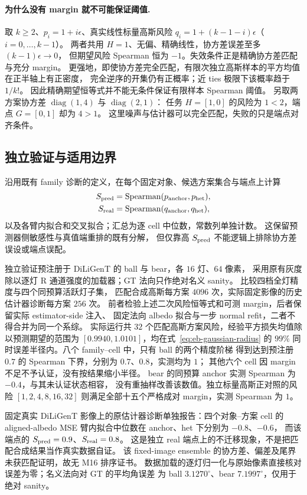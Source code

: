 \paragraph{为什么没有 margin 就不可能保证阈值.}
取 $k\ge2$、$p_i=1+i\epsilon$、真实线性标量高斯风险
$q_i=1+(k-1-i)\epsilon$（$i=0,\ldots,k-1$）。
两者共用 $H=1$、无偏、精确线性，协方差误差至多 $(k-1)\epsilon\to0$，
但期望风险 Spearman 恒为 $-1$。失效条件正是精确协方差匹配与充分 margin。
更强地，即使协方差完全匹配，有限次独立高斯样本的平方均值在正半轴上有正密度，
完全逆序的开集仍有正概率；近 ties 极限下该概率趋于 $1/k!$。
因此精确期望恒等式并不能无条件保证有限样本 Spearman 阈值。
另取两方案协方差 $\operatorname{diag}(1,4)$ 与 $\operatorname{diag}(2,1)$：
任务 $H=[1,0]$ 的风险为 $1<2$，端点 $G=[0,1]$ 却为 $4>1$。
这里噪声与估计器可以完全匹配，失败的只是端点对齐条件。

\subsection{独立验证与适用边界}
沿用既有 family 诊断的定义，在每个固定对象、候选方案集合与端点上计算
\begin{align*}
 S_{\rm pred}&=\operatorname{Spearman}(p_{\rm anchor},p_{\rm het}),\\
 S_{\rm real}&=\operatorname{Spearman}(q_{\rm anchor},q_{\rm het}),
\end{align*}
以及各臂内拟合和交叉拟合；汇总为逐 cell 中位数，常数列单独计数。
这保留预测器侧敏感性与真值端重排的既有分解，
但仅靠高 $S_{\rm pred}$ 不能逻辑上排除协方差误设或端点误配。

独立验证预注册于 DiLiGenT 的 ball 与 bear，各 $16$ 灯、$64$ 像素，
采用原有灰度除以逐灯 R 通道强度的加载器；GT 法向只作绝对名义 sanity。
比较四档全灯精度与四个同预算活跃灯子集，
匹配合成高斯每方案 $4096$ 次，实际固定影像的历史估计器诊断每方案 $256$ 次。
前者检验上述二次风险恒等式和可测 margin，后者保留实际 estimator-side 注入、
固定法向 albedo 拟合与一步 normal refit，二者不得合并为同一个系综。
实际运行共 $32$ 个匹配高斯方案风险，经验平方损失均值除以预测期望的范围为
$[0.9940,1.0101]$，均在式~\eqref{eq:eb-gaussian-radius} 的
$99\%$ 同时误差半径内。八个 family--cell 中，只有 ball 的两个精度阶梯
得到达到预注册 $0.7$ 的 Spearman 下界，分别为 $0.7$、$0.8$，实测均为 $1$；
其他六个 cell 因 margin 不足不予认证，没有按结果缩小半径。
bear 的同预算 anchor 实测 Spearman 为 $-0.4$，与其未认证状态相容，
没有重抽样改善该数值。独立标量高斯正对照的风险
$[1,2,4,8,16,32]$ 则满足全部十五个严格成对 margin，实测 Spearman 为 $1$。

固定真实 DiLiGenT 影像上的原估计器诊断单独报告：四个对象--方案 cell 的
aligned-albedo MSE 臂内拟合中位数在 anchor、het 下分别为 $-0.8$、$-0.6$，
而该端点的 $S_{\rm pred}=0.9$、$S_{\rm real}=0.8$。
这是独立 real 端点上的不迁移现象，不是把匹配合成结果当作真实数据自证。
该 fixed-image ensemble 的协方差、偏差及尾界未获匹配证明，故无 M16 排序证书。
数据加载的逐灯归一化与原始像素直接核对误差为零；名义法向对 GT 的平均角误差
为 ball $3.1270^\circ$、bear $7.1997^\circ$，仅用于绝对 sanity。

